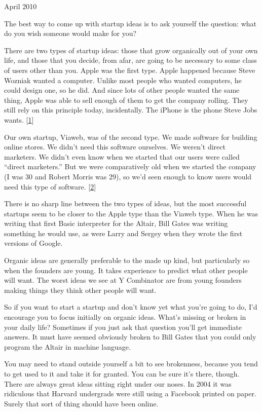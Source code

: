 April 2010

The best way to come up with startup ideas is to ask yourself the
question: what do you wish someone would make for you?

There are two types of startup ideas: those that grow organically out of
your own life, and those that you decide, from afar, are going to be
necessary to some class of users other than you. Apple was the first
type. Apple happened because Steve Wozniak wanted a computer. Unlike
most people who wanted computers, he could design one, so he did. And
since lots of other people wanted the same thing, Apple was able to sell
enough of them to get the company rolling. They still rely on this
principle today, incidentally. The iPhone is the phone Steve Jobs wants.
{[}\hyperref[f1n]{1}{]}

Our own startup, Viaweb, was of the second type. We made software for
building online stores. We didn't need this software ourselves. We
weren't direct marketers. We didn't even know when we started that our
users were called ``direct marketers.'' But we were comparatively old
when we started the company (I was 30 and Robert Morris was 29), so we'd
seen enough to know users would need this type of software.
{[}\hyperref[f2n]{2}{]}

There is no sharp line between the two types of ideas, but the most
successful startups seem to be closer to the Apple type than the Viaweb
type. When he was writing that first Basic interpreter for the Altair,
Bill Gates was writing something he would use, as were Larry and Sergey
when they wrote the first versions of Google.

Organic ideas are generally preferable to the made up kind, but
particularly so when the founders are young. It takes experience to
predict what other people will want. The worst ideas we see at Y
Combinator are from young founders making things they think other people
will want.

So if you want to start a startup and don't know yet what you're going
to do, I'd encourage you to focus initially on organic ideas. What's
missing or broken in your daily life? Sometimes if you just ask that
question you'll get immediate answers. It must have seemed obviously
broken to Bill Gates that you could only program the Altair in machine
language.

You may need to stand outside yourself a bit to see brokenness, because
you tend to get used to it and take it for granted. You can be sure it's
there, though. There are always great ideas sitting right under our
noses. In 2004 it was ridiculous that Harvard undergrads were still
using a Facebook printed on paper. Surely that sort of thing should have
been online.

